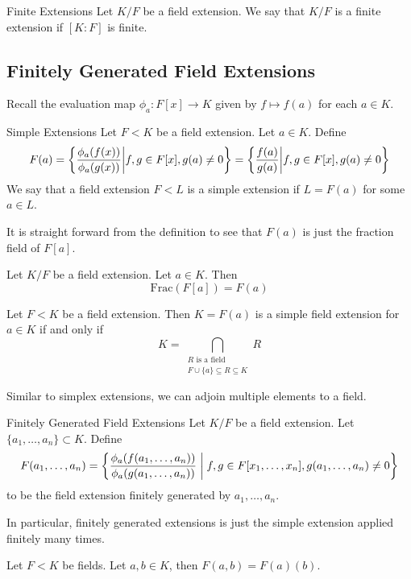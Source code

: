 \documentclass[a4paper]{article}
\begin{document}
\begin{defn}{Finite Extensions}{} Let $K/F$ be a field extension. We say that $K/F$ is a finite extension if $[K:F]$ is finite. 
\end{defn}

\subsection{Finitely Generated Field Extensions}
Recall the evaluation map $\phi_a:F[x]\to K$ given by $f\mapsto f(a)$ for each $a\in K$. 

\begin{defn}{Simple Extensions}{} Let $F<K$ be a field extension. Let $a\in K$. Define 
$$F(a)=\left\{\frac{\phi_a(f(x))}{\phi_a(g(x))}\bigg{|}f,g\in F[x],g(a)\neq 0\right\}=\left\{\frac{f(a)}{g(a)}\bigg{|}f,g\in F[x],g(a)\neq 0\right\}$$
We say that a field extension $F<L$ is a simple extension if $L=F(a)$ for some $a\in L$. 
\end{defn}

It is straight forward from the definition to see that $F(a)$ is just the fraction field of $F[a]$. 

\begin{lmm}{}{} Let $K/F$ be a field extension. Let $a\in K$. Then $$\text{Frac}(F[a])=F(a)$$
\end{lmm}

\begin{prp}{}{} Let $F<K$ be a field extension. Then $K=F(a)$ is a simple field extension for $a\in K$ if and only if $$K=\bigcap_{\substack{R\text{ is a field}\\F\cup\{a\}\subseteq R\subseteq K}}R$$
\end{prp}

Similar to simplex extensions, we can adjoin multiple elements to a field. 

\begin{defn}{Finitely Generated Field Extensions}{} Let $K/F$ be a field extension. Let $\{a_1,\dots,a_n\}\subset K$. Define $$F(a_1,\dots,a_n)=\left\{\frac{\phi_a(f(a_1,\dots,a_n))}{\phi_a(g(a_1,\dots,a_n))}\;\bigg{|}\;f,g\in F[x_1,\dots,x_n],g(a_1,\dots,a_n)\neq 0\right\}$$ to be the field extension finitely generated by $a_1,\dots,a_n$. 
\end{defn}

In particular, finitely generated extensions is just the simple extension applied finitely many times. 

\begin{lmm}{}{} Let $F<K$ be fields. Let $a,b\in K$, then $F(a,b)=F(a)(b)$. 
\end{lmm}
\end{document}
